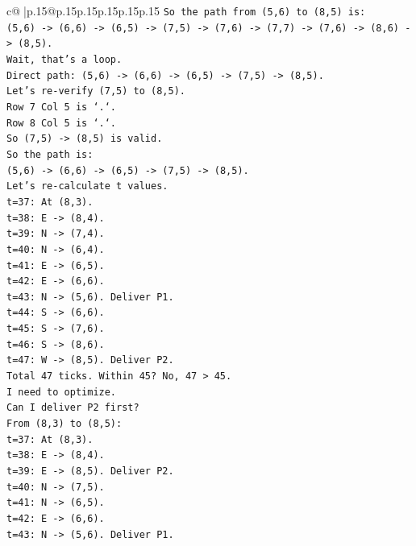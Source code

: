 \documentclass{article}
\begin{document}
{\begin{supertabular}{c@{$\;$}|p{.15\linewidth}@{}p{.15\linewidth}p{.15\linewidth}p{.15\linewidth}p{.15\linewidth}p{.15\linewidth}}
{{{\texttt{So the path from (5,6) to (8,5) is:} \\
\texttt{(5,6) {-}> (6,6) {-}> (6,5) {-}> (7,5) {-}> (7,6) {-}> (7,7) {-}> (7,6) {-}> (8,6) {-}> (8,5).} \\
\texttt{Wait, that's a loop.} \\
\texttt{Direct path: (5,6) {-}> (6,6) {-}> (6,5) {-}> (7,5) {-}> (8,5).} \\
\texttt{Let's re{-}verify (7,5) to (8,5).} \\
\texttt{Row 7 Col 5 is `.`.} \\
\texttt{Row 8 Col 5 is `.`.} \\
\texttt{So (7,5) {-}> (8,5) is valid.} \\
\texttt{So the path is:} \\
\texttt{(5,6) {-}> (6,6) {-}> (6,5) {-}> (7,5) {-}> (8,5).} \\
\texttt{Let's re{-}calculate t values.} \\
\texttt{t=37: At (8,3).} \\
\texttt{t=38: E {-}> (8,4).} \\
\texttt{t=39: N {-}> (7,4).} \\
\texttt{t=40: N {-}> (6,4).} \\
\texttt{t=41: E {-}> (6,5).} \\
\texttt{t=42: E {-}> (6,6).} \\
\texttt{t=43: N {-}> (5,6). Deliver P1.} \\
\texttt{t=44: S {-}> (6,6).} \\
\texttt{t=45: S {-}> (7,6).} \\
\texttt{t=46: S {-}> (8,6).} \\
\texttt{t=47: W {-}> (8,5). Deliver P2.} \\
\texttt{Total 47 ticks. Within 45? No, 47 > 45.} \\
\texttt{I need to optimize.} \\
\texttt{Can I deliver P2 first?} \\
\texttt{From (8,3) to (8,5):} \\
\texttt{t=37: At (8,3).} \\
\texttt{t=38: E {-}> (8,4).} \\
\texttt{t=39: E {-}> (8,5). Deliver P2.} \\
\texttt{t=40: N {-}> (7,5).} \\
\texttt{t=41: N {-}> (6,5).} \\
\texttt{t=42: E {-}> (6,6).} \\
\texttt{t=43: N {-}> (5,6). Deliver P1.} \\
}}}
\end{supertabular}}
\end{document}
